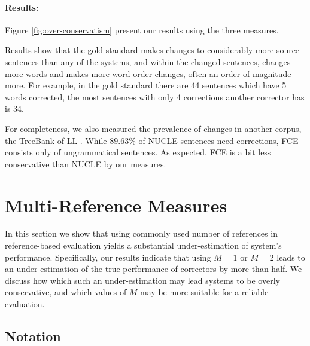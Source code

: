 \documentclass[letter,11pt]{article}
\begin{document}
\paragraph{Results:}
Figure \ref{fig:over-conservatism} present our results using the three measures. %

Results show that the gold standard makes changes to considerably more source sentences than any of the systems, and within the changed sentences, changes more words and makes more word order changes, often an order of magnitude more. For example, in the gold standard there are 44 sentences which have 5 words corrected, the most sentences with only 4 corrections another corrector has is 34.

For completeness, we also measured the prevalence of changes in
another corpus, the TreeBank of LL \cite[FCE]{yannakoudakis2011new}.
While $89.63\%$ of NUCLE sentences need corrections, FCE consists only of ungrammatical sentences. As expected, FCE is a bit less conservative than NUCLE by our measures.


\section{Multi-Reference Measures}\label{sec:increase-reference}

In this section we show that using commonly used number of references in reference-based evaluation yields a substantial under-estimation of system's performance. Specifically, our results indicate that using $M=1$ or $M=2$ leads to an under-estimation of the true performance of correctors by more than half.
We discuss how which such an under-estimation may lead systems to be
overly conservative, and which values of $M$ may be more suitable for
a reliable evaluation.



\subsection{Notation}
\end{document}
